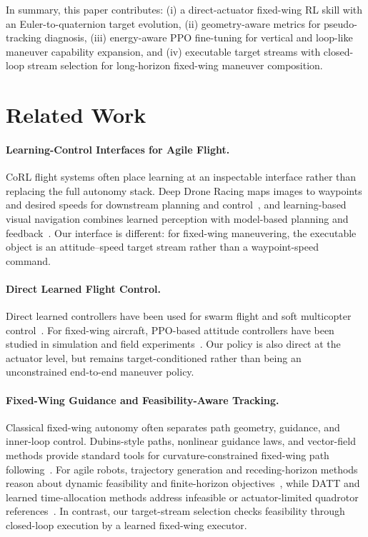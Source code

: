 \documentclass{article}
\begin{document}
In summary, this paper contributes: (i) a direct-actuator fixed-wing RL skill with an Euler-to-quaternion target evolution, (ii) geometry-aware metrics for pseudo-tracking diagnosis, (iii) energy-aware PPO fine-tuning for vertical and loop-like maneuver capability expansion, and (iv) executable target streams with closed-loop stream selection for long-horizon fixed-wing maneuver composition.


\section{Related Work}

\paragraph{Learning-Control Interfaces for Agile Flight.}
CoRL flight systems often place learning at an inspectable interface rather than replacing the full autonomy stack.
Deep Drone Racing maps images to waypoints and desired speeds for downstream planning and control~\citep{kaufmann2018deep}, and learning-based visual navigation combines learned perception with model-based planning and feedback~\citep{bansal2019combining}.
Our interface is different: for fixed-wing maneuvering, the executable object is an attitude--speed target stream rather than a waypoint-speed command.

\paragraph{Direct Learned Flight Control.}
Direct learned controllers have been used for swarm flight and soft multicopter control~\citep{batra2021decentralized,deng2020soft}.
For fixed-wing aircraft, PPO-based attitude controllers have been studied in simulation and field experiments~\citep{bohn2020deep,bohn2024data}.
Our policy is also direct at the actuator level, but remains target-conditioned rather than being an unconstrained end-to-end maneuver policy.

\paragraph{Fixed-Wing Guidance and Feasibility-Aware Tracking.}
Classical fixed-wing autonomy often separates path geometry, guidance, and inner-loop control.
Dubins-style paths, nonlinear guidance laws, and vector-field methods provide standard tools for curvature-constrained fixed-wing path following~\citep{dubins1957curves,park2004new,nelson2007vector,sujit2014uav}.
For agile robots, trajectory generation and receding-horizon methods reason about dynamic feasibility and finite-horizon objectives~\citep{mellinger2011minimum,mayne2000constrained,williams2017mppi,rubinstein1999cross}, while DATT and learned time-allocation methods address infeasible or actuator-limited quadrotor references~\citep{huang2023datt,ryou2022real}.
In contrast, our target-stream selection checks feasibility through closed-loop execution by a learned fixed-wing executor.
\end{document}
